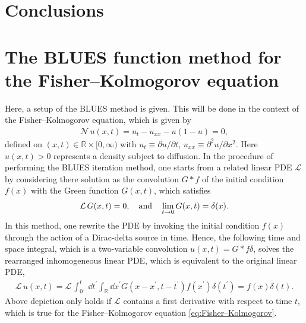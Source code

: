 \documentclass[amsmath,amssymb,amsfonts,aps,pre,preprint,superscriptaddress,bibnotes,showpacs,showkeys,longbibliography]{revtex4-1}
\newcommand*{\lop}{\mathcal{L}\,}
\newcommand*{\nlop}{\mathcal{N}\,}
\begin{document}
\section{Conclusions}
\lipsum[2-3]
\label{sec:conclusions}
\cleardoublepage
\appendix
\section{The BLUES function method for the Fisher–Kolmogorov equation}\label{sec:BLUES_method_pde}
Here, a setup of the BLUES method is given. This will be done in the context of the Fisher–Kolmogorov equation, which is given by
\begin{align}\label{eq:Fisher–Kolmogorov_appendix}
    \nlop u(x,t)=u_t - u_{xx} -u(1-u)=0,
\end{align}
defined on $(x,t) \in \mathbb{R} \times [0,\infty)$ with $u_t\equiv\partial u / \partial t$,  $u_{xx}\equiv\partial^2 u / \partial x^2$. Here $u(x,t)>0$ represents a density subject to diffusion. In the procedure of performing the BLUES iteration method, one starts from a related linear PDE $\mathcal{L}$ by considering there solution as the convolution $G*f$ of the initial condition $f(x)$ with the Green function $G(x,t)$, which satisfies
\begin{align}
    \label{eq:linear_operator_delta_G}
    \lop G(x,t)=0, \qq{and} \lim_{t\to 0}G(x,t)=\delta(x).
\end{align}
In this method, one rewrite the PDE by invoking the initial condition $f(x)$ through the action of a Dirac-delta source in time. Hence, the following time and space integral, which is a two-variable convolution $u(x, t) = G \ast f \delta$, solves the rearranged inhomogeneous linear PDE, which is equivalent to the original linear PDE,
\begin{align}
 \label{eq:rewriten_linear_operator_delta_u_appendix}
	\lop u(x, t)=\lop \int_{0^{-}}^{t} \dd{t^{\prime}} \int_{\mathbb{R}} \dd{x^{\prime}} G\left(x-x^{\prime}, t-t^{\prime}\right) f\left(x^{\prime}\right) \delta\left(t^{\prime}\right)=f(x) \delta(t).
\end{align}
Above depiction only holds if $\mathcal{L}$ contains a first derivative with respect to time $t$, which is true for the Fisher–Kolmogorov equation \eqref{eq:Fisher–Kolmogorov}. 
\end{document}
